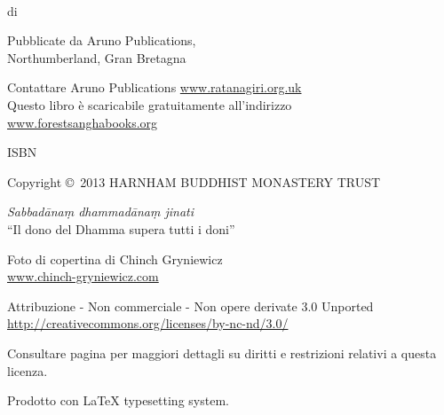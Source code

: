 {\copyrightsize\setlength{\parskip}{0.5\baselineskip}\setlength{\parindent}{0em}%
\raggedright%
\shaker\color[gray]{0.3}

\thetitle\\
di \theauthor

Pubblicate da Aruno Publications,\\
Northumberland, Gran Bretagna

Contattare Aruno Publications \href{http://ratanagiri.org.uk/}{www.ratanagiri.org.uk}\\
Questo libro \`{e} scaricabile gratuitamente all'indirizzo\\
\href{http://forestsanghabooks.org/}{www.forestsanghabooks.org}

ISBN \theISBN

Copyright \copyright\ 2013 HARNHAM BUDDHIST MONASTERY TRUST

\textit{Sabbadānaṃ dhammadānaṃ jinati}\\
``Il dono del Dhamma supera tutti i doni''

Foto di copertina di Chinch Gryniewicz\\
\href{http://chinch-gryniewicz.com}{www.chinch-gryniewicz.com}

{\tiny

Attribuzione - Non commerciale - Non opere derivate 3.0 Unported\\
\href{http://creativecommons.org/licenses/by-nc-nd/3.0/}{http://creativecommons.org/licenses/by-nc-nd/3.0/}

Consultare pagina \pageref{copyright-details} per maggiori dettagli su diritti e restrizioni relativi a questa licenza.

Prodotto con {\selectfont\LaTeX} typesetting system.

\theEditionInfo

}}


